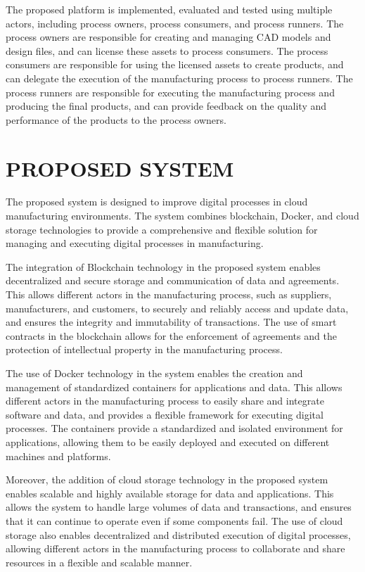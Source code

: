 \documentclass[10pt,a4paper]{report}
\begin{document}
\large\justify The proposed platform is implemented, evaluated and tested using multiple actors, including process owners, process consumers, and process runners. The process owners are responsible for creating and managing CAD models and design files, and can license these assets to process consumers. The process consumers are responsible for using the licensed assets to create products, and can delegate the execution of the manufacturing process to process runners. The process runners are responsible for executing the manufacturing process and producing the final products, and can provide feedback on the quality and performance of the products to the process owners.


\newpage
\chapter{PROPOSED SYSTEM}
\large\justify The proposed system is designed to improve digital processes in cloud manufacturing environments. The system combines blockchain, Docker, and cloud storage technologies to provide a comprehensive and flexible solution for managing and executing digital processes in manufacturing.

\large\justify The integration of Blockchain technology in the proposed system enables decentralized and secure storage and communication of data and agreements. This allows different actors in the manufacturing process, such as suppliers, manufacturers, and customers, to securely and reliably access and update data, and ensures the integrity and immutability of transactions. The use of smart contracts in the blockchain allows for the enforcement of agreements and the protection of intellectual property in the manufacturing process.

\large\justify The use of Docker technology in the system enables the creation and management of standardized containers for applications and data. This allows different actors in the manufacturing process to easily share and integrate software and data, and provides a flexible framework for executing digital processes. The containers provide a standardized and isolated environment for applications, allowing them to be easily deployed and executed on different machines and platforms.

\large\justify Moreover, the addition of cloud storage technology in the proposed system enables scalable and highly available storage for data and applications. This allows the system to handle large volumes of data and transactions, and ensures that it can continue to operate even if some components fail. The use of cloud storage also enables decentralized and distributed execution of digital processes, allowing different actors in the manufacturing process to collaborate and share resources in a flexible and scalable manner.
\end{document}
